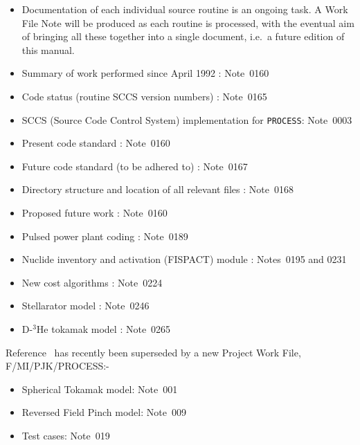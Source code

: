 \documentclass[11pt,a4paper]{report}
\newcommand{\process}{\mbox{\texttt{PROCESS}}}
\begin{document}
\begin{itemize}
\item
Documentation of each individual source routine is an ongoing task. A
Work File Note will be produced as each routine is processed, with the
eventual aim of bringing all these together into a single document,
i.e.\ a future edition of this manual.
\item
Summary of work performed since April 1992 : Note~0160
\item
Code status (routine SCCS version numbers) : Note~0165
\item
SCCS (Source Code Control System) implementation for \process: Note~0003
\item
Present code standard : Note~0160
\item
Future code standard (to be adhered to) : Note~0167
\item
Directory structure and location of all relevant files : Note~0168
\item
Proposed future work : Note~0160
\item
Pulsed power plant coding : Note~0189
\item
Nuclide inventory and activation (FISPACT) module : Notes~0195 and 0231
\item
New cost algorithms : Note~0224
\item
Stellarator model : Note~0246
\item
D-$^3$He tokamak model : Note~0265
\end{itemize}

Reference~\cite{PWF} has recently been superseded by a new Project Work File,
F/MI/PJK/PROCESS:-

\begin{itemize}
\item
Spherical Tokamak model: Note~001

\item
Reversed Field Pinch model: Note~009

\item
Test cases: Note~019

\end{itemize}
\end{document}
